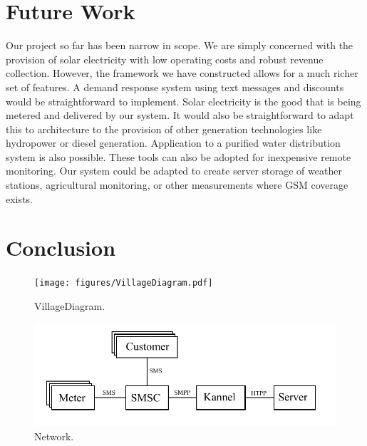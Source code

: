 \documentclass[conference]{IEEEtran}
\begin{document}
\section{Future Work}
Our project so far has been narrow in scope.  We are simply concerned with the
provision of solar electricity with low operating costs and robust revenue 
collection.  However, the framework we have constructed allows for a much 
richer set of features.  
A demand response system using text messages and discounts
would be straightforward to implement.  
Solar electricity is the good that is being metered and delivered by our
system.  It would also be straightforward to adapt this to architecture
to the provision of other generation technologies like hydropower or 
diesel generation.  Application to a purified water distribution system
is also possible.  
These tools can also be adopted for inexpensive remote monitoring.  Our 
system could be adapted to create server storage of weather stations, 
agricultural monitoring, or other measurements where GSM coverage exists.


\section{Conclusion}


\begin{figure}[]
\begin{center}
\texttt{[image: figures/VillageDiagram.pdf]}
\end{center}
\caption{VillageDiagram.}
\label{ShedWiringDiagram}
\end{figure}


\begin{figure}[]
\begin{center}
\includegraphics[width=\columnwidth]{figures/NetworkDiagram.pdf}
\end{center}
\caption{Network.}
\label{SoftwareDiagram}
\end{figure}
\end{document}
